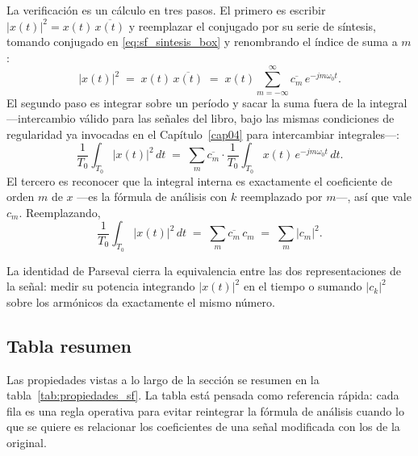 \documentclass[class=book, crop=false]{standalone}
\begin{document}
La verificación es un cálculo en tres pasos. El primero es escribir
$|x(t)|^2 = x(t)\,\overline{x(t)}$ y reemplazar el conjugado por su
serie de síntesis, tomando conjugado en \eqref{eq:sf_sintesis_box} y
renombrando el índice de suma a $m$:
\begin{equation*}
    |x(t)|^2
    \;=\; x(t)\,\overline{x(t)}
    \;=\; x(t)\sum_{m=-\infty}^{\infty}\overline{c_m}\,e^{-jm\omega_0 t}.
\end{equation*}
El segundo paso es integrar sobre un período y sacar la suma fuera
de la integral ---intercambio válido para las señales del libro, bajo
las mismas condiciones de regularidad ya invocadas en el
Capítulo~\ref{cap04} para intercambiar integrales---:
\begin{equation*}
    \frac{1}{T_0}\int_{T_0}|x(t)|^2\,dt
    \;=\; \sum_{m}\overline{c_m}\cdot
        \frac{1}{T_0}\int_{T_0} x(t)\,e^{-jm\omega_0 t}\,dt.
\end{equation*}
El tercero es reconocer que la integral interna es exactamente el
coeficiente de orden $m$ de $x$ ---es la fórmula de análisis con $k$
reemplazado por $m$---, así que vale $c_m$. Reemplazando,
\begin{equation*}
    \frac{1}{T_0}\int_{T_0}|x(t)|^2\,dt
    \;=\; \sum_{m} \overline{c_m}\,c_m
    \;=\; \sum_{m} |c_m|^2.
\end{equation*}

La identidad de Parseval cierra la equivalencia entre las dos
representaciones de la señal: medir su potencia integrando
$|x(t)|^2$ en el tiempo o sumando $|c_k|^2$ sobre los armónicos da
exactamente el mismo número.

\subsection{Tabla resumen}
\label{subsec:tabla_propiedades}

Las propiedades vistas a lo largo de la sección se resumen en la
tabla~\ref{tab:propiedades_sf}. La tabla está pensada como
referencia rápida: cada fila es una regla operativa para evitar
reintegrar la fórmula de análisis cuando lo que se quiere es
relacionar los coeficientes de una señal modificada con los de la
original.
\end{document}
